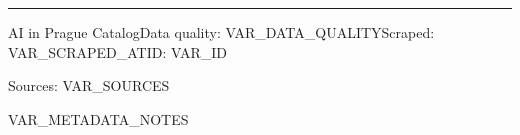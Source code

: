 \documentclass[a4paper,9pt]{article}
\begin{document}
\vfill

\textcolor{border}{\rule{\textwidth}{0.3pt}}
{\color{muted}\fontsize{6}{7}\selectfont AI in Prague Catalog\hfill Data quality: VAR_DATA_QUALITY\hfill Scraped: VAR_SCRAPED_AT\hfill ID: VAR_ID}

{\color{muted}\fontsize{5.5}{6.5}\selectfont Sources: VAR_SOURCES}

VAR_METADATA_NOTES
\end{document}
